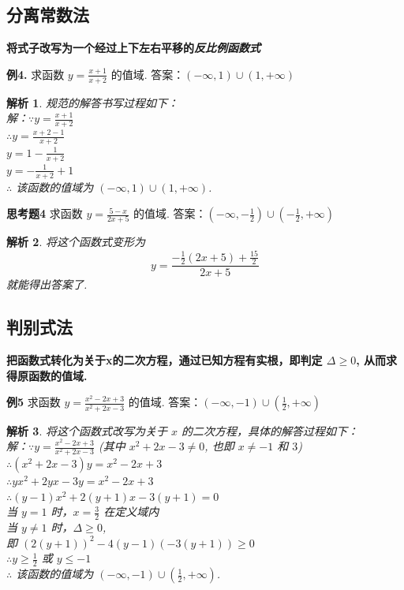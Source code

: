 \documentclass{article}
\theoremstyle{plain}
\newtheorem{aly}{解析}
\begin{document}
\subsection{分离常数法}
\textbf{将式子改写为一个经过上下左右平移的\emph{反比例函数式}}

\textbf{例4.} 求函数 $y=\frac{x+1}{x+2}$ 的值域. \hspace{25pt} 答案：$(-\infty, 1) \cup (1, +\infty)$

\begin{aly}
  规范的解答书写过程如下：\\
  解：$\because y=\frac{x+1}{x+2}$\\
  $\therefore y=\frac{x+2-1}{x+2}$\\
  $y=1-\frac{1}{x+2}$\\
  $y=-\frac{1}{x+2}+1$\\
  $\therefore$ 该函数的值域为 $(-\infty, 1) \cup (1, +\infty)$.
\end{aly}

\textbf{思考题4} 求函数 $y=\frac{5-x}{2x+5}$ 的值域. \hspace{25pt} 答案：$(-\infty, -\frac{1}{2}) \cup (-\frac{1}{2}, +\infty)$

\begin{aly}
  将这个函数式变形为 \[y=\frac{-\frac{1}{2}(2x+5)+\frac{15}{2}}{2x+5}\]就能得出答案了.
\end{aly}


\subsection{判别式法}
\textbf{把函数式转化为关于x的二次方程，通过已知方程有实根，即判定 $\Delta \geqslant 0$, 从而求得原函数的值域. }

\textbf{例5} 求函数 $y=\frac{x^2-2x+3}{x^2+2x-3}$ 的值域. \hspace{25pt} 答案：$(-\infty, -1) \cup (\frac{1}{2}, +\infty)$

\begin{aly}
  将这个函数式改写为关于 $x$ 的二次方程，具体的解答过程如下： \\
  解：$\because y=\frac{x^2-2x+3}{x^2+2x-3}$
  (其中 $x^2+2x-3 \neq 0$, 也即 $x \neq -1$ 和 $3$)\\
  $\therefore (x^2+2x-3)y=x^2-2x+3$\\
  $\therefore yx^2+2yx-3y=x^2-2x+3$\\
  $\therefore (y-1)x^2+2(y+1)x-3(y+1)=0$\\
   当 $y=1$ 时，$x=\frac{3}{2}$ 在定义域内\\
   当 $y \neq 1$ 时，$\Delta \geqslant 0$, \\
  即 $(2(y+1))^2-4(y-1)(-3(y+1)) \geqslant 0$\\
  $\therefore y \geqslant \frac{1}{2}$ 或 $y \leqslant -1$\\
  $\therefore$ 该函数的值域为 $(-\infty, -1) \cup (\frac{1}{2}, +\infty)$.
\end{aly}
\end{document}
